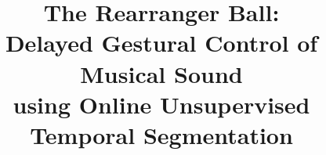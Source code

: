\documentclass{nime-alternate_ADJ} %
\begin{document}


\title{The Rearranger Ball:\\
Delayed Gestural Control of Musical Sound\\
using Online Unsupervised Temporal Segmentation\\
}

%
%
%
%
\end{document}
